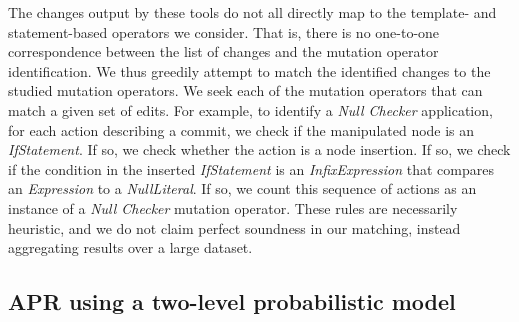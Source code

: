 \documentclass[conference]{IEEEtran}
\begin{document}
The changes output by these tools do not all directly map to the template- and
statement-based operators we consider.  That is, there is no one-to-one
correspondence between the list of changes and the mutation operator
identification. We thus greedily attempt to match the identified changes to the 
studied
mutation operators. We seek each of the mutation operators that can match a given set
of edits.  For example, to identify
a \emph{Null Checker} application, for each action describing a commit, we check
if the manipulated node
is an \emph{IfStatement}.  If so, we check whether the action
is a node insertion.  If so, we check if the condition in the inserted
\emph{IfStatement} is an 
\emph{InfixExpression} that compares an 
\emph{Expression} to a
\emph{NullLiteral}. If so, we count this sequence of
actions as an instance of a \emph{Null Checker} mutation operator.  These rules are
necessarily heuristic, and we do not claim perfect soundness in our matching,
instead aggregating results over a large dataset.  






\subsection{APR using a two-level probabilistic model}
\label{sec:modelrepair} 
\end{document}
